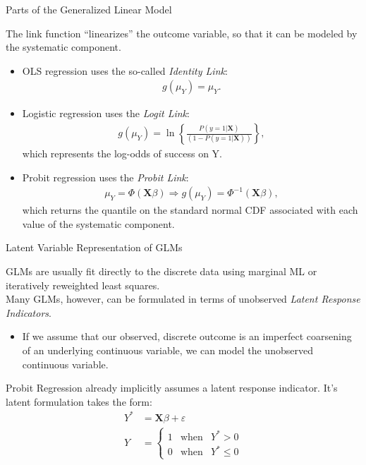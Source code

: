 \documentclass{beamer}
\begin{document}
\begin{frame}{Parts of the Generalized Linear Model}

  The link function ``linearizes'' the outcome variable, so that it
  can be modeled by the systematic component.
  \begin{itemize}
  \item OLS regression uses the so-called \emph{Identity Link}:
    \begin{align*}
      g(\mu_Y) = \mu_Y.
    \end{align*}
    \vspace{6pt}
  \item Logistic regression uses the \emph{Logit Link}:
    \begin{align*}
      g(\mu_Y) = \ln \left\{ \frac{P(y = 1 | \mathbf{X})}{(1 - P(y = 1
      | \mathbf{X}))} \right\},
    \end{align*}
    which represents the log-odds of success on Y.
    \vspace{12pt}
  \item Probit regression uses the \emph{Probit Link}:
    \begin{align*}
      \mu_Y = \Phi(\mathbf{X}\beta) \Rightarrow g(\mu_Y) =
      \Phi^{-1}(\mathbf{X}\beta),
    \end{align*}
    which returns the quantile on the standard normal CDF associated
    with each value of the systematic component.
  \end{itemize}

\end{frame}


\begin{frame}{Latent Variable Representation of GLMs}

  GLMs are usually fit directly to the discrete data using marginal ML
  or iteratively reweighted least squares.\\
  \vspace{12pt}
  Many GLMs, however, can be formulated in terms of unobserved
  \emph{Latent Response Indicators}.
  \begin{itemize}
  \item If we assume that our observed, discrete outcome is an
    imperfect coarsening of an underlying continuous variable, we
    can model the unobserved continuous variable.
  \end{itemize}
  \vspace{12pt}
  Probit Regression already implicitly assumes a latent response
  indicator. It's latent formulation takes the form:
  \begin{align*}
    Y^* &= \mathbf{X}\beta + \varepsilon\\
    Y &= \left\{ \begin{array}{ccl}
                   1 & \text{when} & Y^* > 0\\
                 0 & \text{when} & Y^* \leq 0
                 \end{array}\right.
  \end{align*}

\end{frame}
\end{document}
